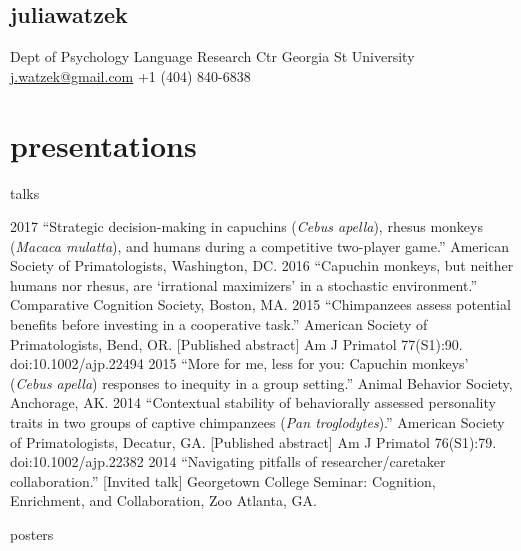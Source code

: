 \documentclass[]{friggeri-cv}
\begin{document}
\begin{aside}
  \section{{\normalfont julia}watzek}
    Dept of Psychology
    Language Research Ctr
    Georgia St University
    ~
    \href{mailto:j.watzek@gmail.com}{j.watzek@gmail.com}
    +1 (404) 840-6838
\end{aside}



\section{presentations}


{\subfont\large{} talks}

\begin{entrylist2}
  \entrytwo
    {2017}
    {``Strategic decision-making in capuchins (\emph{Cebus apella}), rhesus monkeys (\emph{Macaca mulatta}), and humans during a competitive two-player game.'' American Society of Primatologists, Washington, DC.}
  \entrytwo
    {2016}
    {``Capuchin monkeys, but neither humans nor rhesus, are `irrational maximizers' in a stochastic environment.'' Comparative Cognition Society, Boston, MA.}
  \entrytwo
    {2015}
    {``Chimpanzees assess potential benefits before investing in a cooperative task.'' American Society of Primatologists, Bend, OR. [Published abstract] Am J Primatol 77(S1):90. doi:10.1002/ajp.22494}
  \entrytwo
    {2015}
    {``More for me, less for you: Capuchin monkeys' (\emph{Cebus apella}) responses to inequity in a group setting.'' Animal Behavior Society, Anchorage, AK.}
  \entrytwo
    {2014}
    {``Contextual stability of behaviorally assessed personality traits in two groups of captive chimpanzees (\emph{Pan troglodytes}).'' American Society of Primatologists, Decatur, GA. [Published abstract] Am J Primatol 76(S1):79. doi:10.1002/ajp.22382}
  \entrytwo
    {2014}
    {``Navigating pitfalls of researcher/caretaker collaboration.'' [Invited talk] Georgetown College Seminar: Cognition, Enrichment, and Collaboration, Zoo Atlanta, GA.}
\end{entrylist2}


{\subfont\large{} posters}
\end{document}
